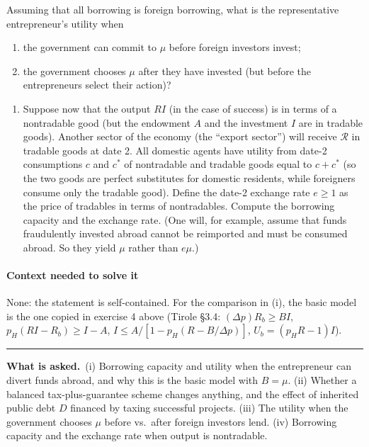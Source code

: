 \documentclass[11pt,a4paper]{article}
\newcommand{\asked}{\par\medskip\noindent\textbf{What is asked.}~}
\providecommand{\tightlist}{\setlength{\itemsep}{0pt}\setlength{\parskip}{0pt}}
\newcommand{\stmtend}{\par\endgroup\nopagebreak\noindent\rule{\linewidth}{0.4pt}\par\medskip}
\begin{document}
Assuming that all borrowing is foreign borrowing, what is the representative entrepreneur's utility
when

\begin{enumerate}
\def\labelenumi{(\alph{enumi})}
\item
  the government can commit to \(\mu\) before foreign investors invest;
\item
  the government chooses \(\mu\) after they have invested (but before the entrepreneurs select their
  action)?
\end{enumerate}

\begin{enumerate}
\def\labelenumi{(\roman{enumi})}
\setcounter{enumi}{3}
\tightlist
\item
  Suppose now that the output \(RI\) (in the case of success) is in terms of a nontradable good (but
  the endowment \(A\) and the investment \(I\) are in tradable goods). Another sector of the economy
  (the ``export sector'') will receive \(\mathcal{R}\) in tradable goods at date 2. All domestic
  agents have utility from date-2 consumptions \(c\) and \(c^*\) of nontradable and tradable goods
  equal to \(c + c^*\) (so the two goods are perfect substitutes for domestic residents, while
  foreigners consume only the tradable good). Define the date-2 exchange rate \(e \geqslant 1\) as
  the price of tradables in terms of nontradables. Compute the borrowing capacity and the exchange
  rate. (One will, for example, assume that funds fraudulently invested abroad cannot be reimported
  and must be consumed abroad. So they yield \(\mu\) rather than \(e\mu\).)
\end{enumerate}

\paragraph{Context needed to solve it}

None: the statement is self-contained. For the comparison in (i), the basic model is the one copied
in exercise 4 above (Tirole §3.4: \((\Delta p)R_b \geqslant BI\), \(p_H(RI - R_b) \geqslant I - A\),
\(I \leqslant A/[1 - p_H(R - B/\Delta p)]\), \(U_b = (p_H R - 1)I\)).
\stmtend

\asked (i) Borrowing capacity and utility when the entrepreneur can divert funds abroad, and why this is the basic model with $B=\mu$. (ii) Whether a balanced tax-plus-guarantee scheme changes anything, and the effect of inherited public debt $D$ financed by taxing successful projects. (iii) The utility when the government chooses $\mu$ before vs.\ after foreign investors lend. (iv) Borrowing capacity and the exchange rate when output is nontradable.
\end{document}
